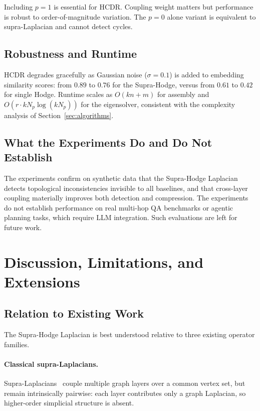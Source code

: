 \documentclass[11pt]{article}
\theoremstyle{definition}
\theoremstyle{remark}
\begin{document}
Including $p=1$ is essential for HCDR. Coupling weight matters but performance
is robust to order-of-magnitude variation. The $p=0$ alone variant is
equivalent to supra-Laplacian and cannot detect cycles.

\subsection{Robustness and Runtime}

HCDR degrades gracefully as Gaussian noise ($\sigma=0.1$) is added to embedding
similarity scores: from $0.89$ to $0.76$ for the Supra-Hodge, versus from
$0.61$ to $0.42$ for single Hodge. Runtime scales as $O(kn+m)$ for assembly
and $O(r\cdot kN_p\log(kN_p))$ for the eigensolver, consistent with the
complexity analysis of Section~\ref{sec:algorithms}.

\subsection{What the Experiments Do and Do Not Establish}

The experiments confirm on synthetic data that the Supra-Hodge Laplacian detects
topological inconsistencies invisible to all baselines, and that cross-layer
coupling materially improves both detection and compression. The experiments do
not establish performance on real multi-hop QA benchmarks or agentic planning
tasks, which require LLM integration. Such evaluations are left for future work.


\section{Discussion, Limitations, and Extensions}
\label{sec:discussion}

\subsection{Relation to Existing Work}

The Supra-Hodge Laplacian is best understood relative to three existing operator families.

\paragraph{Classical supra-Laplacians.}
Supra-Laplacians~\cite{dedomenico2013,gomez2013} couple multiple graph layers over a common vertex set, but remain intrinsically pairwise: each layer contributes only a graph Laplacian, so higher-order simplicial structure is absent.
\end{document}
